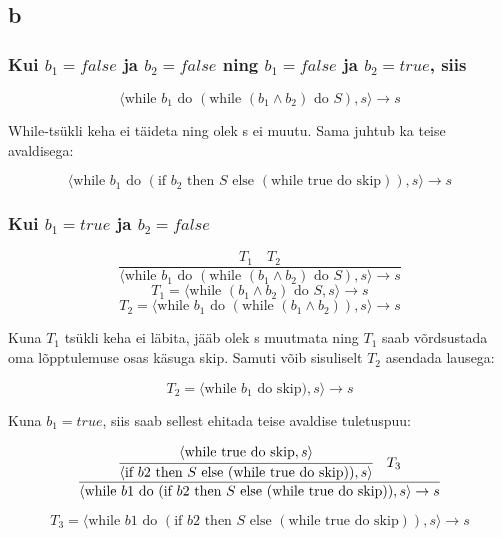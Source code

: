 \subsection{b}

\subsubsection{ Kui \(b_1 = false\) ja \(b_2 = false\) ning \(b_1 = false\) ja \(b_2 = true\), siis}

\[
    \langle
    \text{while } b_1 \text{ do } (\text{while } (b_1 \wedge b_2) \text{ do } S), s
    \rangle \rightarrow s
\]

While-tsükli keha ei täideta ning olek s ei muutu. Sama juhtub ka teise avaldisega:

\[
    \langle
    \text{while } b_1 \text{ do } (\text{if } b_2 \text{ then } S \text{ else }
    (\text{while true do skip})) , s
    \rangle \rightarrow s
\]


\subsubsection{Kui \(b_1 = true\) ja \(b_2 = false\)}

\[
  \frac{
    T_1
    \quad
    T_2
  }{
    \langle
    \text{while } b_1 \text{ do } (\text{while } (b_1 \wedge b_2) \text{ do } S), s
    \rangle \rightarrow s 
  }
\] 
\[T_1 = \langle \text{while } (b_1 \wedge b_2) \text{ do } S, s \rangle \rightarrow s\]
\[T_2 = \langle \text{while } b_1 \text{ do } (\text{while } (b_1 \wedge b_2)), s \rangle \rightarrow s\]

Kuna \(T_1\) tsükli keha ei läbita, jääb olek s muutmata ning \(T_1\) saab võrdsustada
oma lõpptulemuse osas käsuga skip. Samuti võib sisuliselt \(T_2\) asendada lausega:

\[T_2 = \langle \text{while } b_1 \text{ do } \text{skip}), s \rangle \rightarrow s\]

Kuna \(b_1 = true\), siis saab sellest ehitada teise avaldise tuletuspuu:


\[
  \frac{
    \cfrac{
      \langle \text{while true do skip}, s \rangle
    }{
      \langle \text{if } b2 \text{ then } S \text{ else } (\text{while true do
      skip}))
      ,s
      \rangle
    }
    \quad
    T_3
  }{
    \langle
    \text{while } b1 \text{ do } (\text{if } b2 \text{ then } S \text{ else }
    (\text{while true do skip}))
    ,s
    \rangle \rightarrow s 
  }
\] 

\[T_3 = 
    \langle
    \text{while } b1 \text{ do } (\text{if } b2 \text{ then } S \text{ else }
    (\text{while true do skip}))
    ,s
    \rangle \rightarrow s 
  \]

